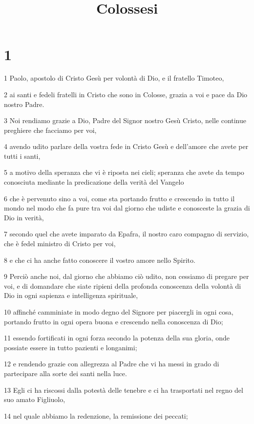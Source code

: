 

\title{Colossesi}


\chapter{1}

\par 1 Paolo, apostolo di Cristo Gesù per volontà di Dio, e il fratello Timoteo,
\par 2 ai santi e fedeli fratelli in Cristo che sono in Colosse, grazia a voi e pace da Dio nostro Padre.
\par 3 Noi rendiamo grazie a Dio, Padre del Signor nostro Gesù Cristo, nelle continue preghiere che facciamo per voi,
\par 4 avendo udito parlare della vostra fede in Cristo Gesù e dell'amore che avete per tutti i santi,
\par 5 a motivo della speranza che vi è riposta nei cieli; speranza che avete da tempo conosciuta mediante la predicazione della verità del Vangelo
\par 6 che è pervenuto sino a voi, come sta portando frutto e crescendo in tutto il mondo nel modo che fa pure tra voi dal giorno che udiste e conosceste la grazia di Dio in verità,
\par 7 secondo quel che avete imparato da Epafra, il nostro caro compagno di servizio, che è fedel ministro di Cristo per voi,
\par 8 e che ci ha anche fatto conoscere il vostro amore nello Spirito.
\par 9 Perciò anche noi, dal giorno che abbiamo ciò udito, non cessiamo di pregare per voi, e di domandare che siate ripieni della profonda conoscenza della volontà di Dio in ogni sapienza e intelligenza spirituale,
\par 10 affinché camminiate in modo degno del Signore per piacergli in ogni cosa, portando frutto in ogni opera buona e crescendo nella conoscenza di Dio;
\par 11 essendo fortificati in ogni forza secondo la potenza della sua gloria, onde possiate essere in tutto pazienti e longanimi;
\par 12 e rendendo grazie con allegrezza al Padre che vi ha messi in grado di partecipare alla sorte dei santi nella luce.
\par 13 Egli ci ha riscossi dalla potestà delle tenebre e ci ha trasportati nel regno del suo amato Figliuolo,
\par 14 nel quale abbiamo la redenzione, la remissione dei peccati;
